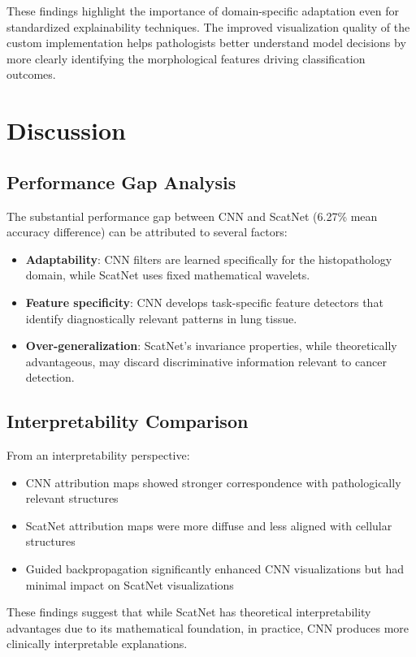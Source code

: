 \documentclass[10pt,twocolumn]{article}
\begin{document}
These findings highlight the importance of domain-specific adaptation even for standardized explainability techniques. The improved visualization quality of the custom implementation helps pathologists better understand model decisions by more clearly identifying the morphological features driving classification outcomes.

\section{Discussion}
\subsection{Performance Gap Analysis}
The substantial performance gap between CNN and ScatNet (6.27\% mean accuracy difference) can be attributed to several factors:

\begin{itemize}
    \item \textbf{Adaptability}: CNN filters are learned specifically for the histopathology domain, while ScatNet uses fixed mathematical wavelets.
    \item \textbf{Feature specificity}: CNN develops task-specific feature detectors that identify diagnostically relevant patterns in lung tissue.
    \item \textbf{Over-generalization}: ScatNet's invariance properties, while theoretically advantageous, may discard discriminative information relevant to cancer detection.
\end{itemize}

\subsection{Interpretability Comparison}
From an interpretability perspective:
\begin{itemize}
    \item CNN attribution maps showed stronger correspondence with pathologically relevant structures
    \item ScatNet attribution maps were more diffuse and less aligned with cellular structures
    \item Guided backpropagation significantly enhanced CNN visualizations but had minimal impact on ScatNet visualizations
\end{itemize}

These findings suggest that while ScatNet has theoretical interpretability advantages due to its mathematical foundation, in practice, CNN produces more clinically interpretable explanations.
\end{document}
